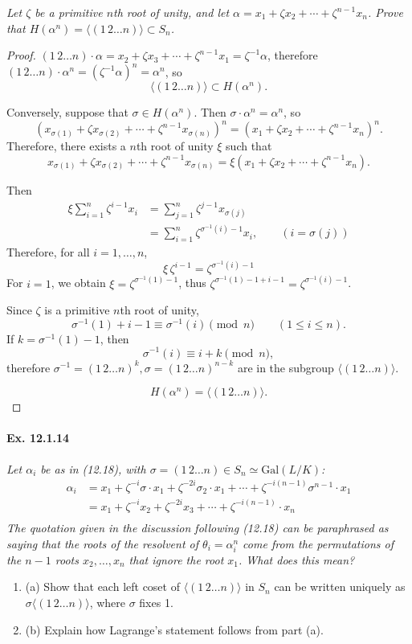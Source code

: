 \documentclass[11pt,a4paper]{article}
\newcommand{\be} {\begin{enumerate}}
\newcommand{\ee} {\end{enumerate}}
\newcommand{\Gal}{\mathrm{Gal}}
\begin{document}
{\it Let $\zeta$ be a primitive $n$th root of unity, and let ${\alpha = x_1+\zeta x_2+\cdots + \zeta^{n-1}x_n}$. Prove that $H(\alpha^n) = \langle (1\,2\ldots n)\rangle \subset S_n$.
}

\begin{proof}
$(1\,2\ldots n)\cdot \alpha =  x_2+\zeta x_3+\cdots + \zeta^{n-1}x_1 = \zeta^{-1} \alpha$, therefore $(1\,2\ldots n)\cdot \alpha^n = (\zeta^{-1} \alpha)^n = \alpha^n$, so 
$$ \langle (1\,2\ldots n)\rangle \subset H(\alpha^n).$$

Conversely, suppose that $\sigma \in H(\alpha^n)$.  Then $\sigma \cdot \alpha^n = \alpha^n$, so
$$(x_{\sigma(1)}+ \zeta x_{\sigma(2)} + \cdots +\zeta^{n-1} x_{\sigma(n)})^n = (x_1+\zeta x_2+\cdots + \zeta^{n-1}x_n)^n.$$
Therefore, there exists a $n$th root of unity $\xi$ such that
$$x_{\sigma(1)}+ \zeta x_{\sigma(2)} + \cdots + \zeta^{n-1} x_{\sigma(n)} = \xi (x_1+\zeta x_2+\cdots + \zeta^{n-1}x_n).$$

Then
\begin{align*}
\xi \sum_{i=1}^n \zeta^{i-1} x_{i} &= \sum_{j=1}^n \zeta^{j-1} x_{\sigma(j)}\\
&=\sum_{i=1}^n \zeta^{\sigma^{-1}(i)-1} x_i, \qquad (i = \sigma(j))
\end{align*}
Therefore, for all $i=1,\ldots,n$,
$$\xi\, \zeta^{i-1} = \zeta^{\sigma^{-1}(i)-1}$$
For $i=1$, we obtain $\xi =\zeta^{\sigma^{-1}(1)-1}$, thus $\zeta^{\sigma^{-1}(1)-1+ i-1} = \zeta^{\sigma^{-1}(i)-1}$.

Since $\zeta$ is a primitive $n$th root of unity,
$$\sigma^{-1}(1)+ i-1 \equiv \sigma^{-1}(i) \pmod n \qquad (1\leq i \leq n).$$
If $k = \sigma^{-1}(1) -1$, then 
$$\sigma^{-1}(i) \equiv i+k \pmod n,$$
therefore $\sigma^{-1} = (1\,2\ldots n)^k, \sigma = (1\,2\ldots n)^{n-k}$ are in the subgroup  $\langle (1\,2\ldots n)\rangle$.

$$H(\alpha^n) = \langle (1\,2\ldots n)\rangle.$$
\end{proof}

\paragraph{Ex. 12.1.14}

{\it Let $\alpha_i$ be as in (12.18), with $\sigma = (1\, 2 \ldots n) \in S_n \simeq \Gal(L/K)$:
\begin{align*}
\alpha_i &= x_1+\zeta^{-i} \sigma \cdot x_1+\zeta^{-2i} \sigma_2 \cdot x_1 + \cdots + \zeta^{-i(n-1)} \sigma^{n-1} \cdot x_1\\
&=x_1+\zeta^{-i} x_2 +\zeta^{-2i} x_3 + \cdots + \zeta^{-i(n-1)}\cdot x_n\\
\end{align*}
The quotation given in the discussion following (12.18) can be paraphrased as saying that the roots of the resolvent of $\theta_i =\alpha_i^n$ come from the permutations of the $n-1$ roots $x_2,\ldots,x_n$ that ignore the root $x_1$. What does this mean?
\be
\item[(a)] Show that each left coset of $\langle (1\, 2 \ldots n) \rangle$ in $S_n$ can be written uniquely as $\sigma \langle (1\, 2 \ldots n) \rangle$, where $\sigma$ fixes 1.
\item[(b)] Explain how Lagrange's statement follows from part (a).
\ee
}
\end{document}
